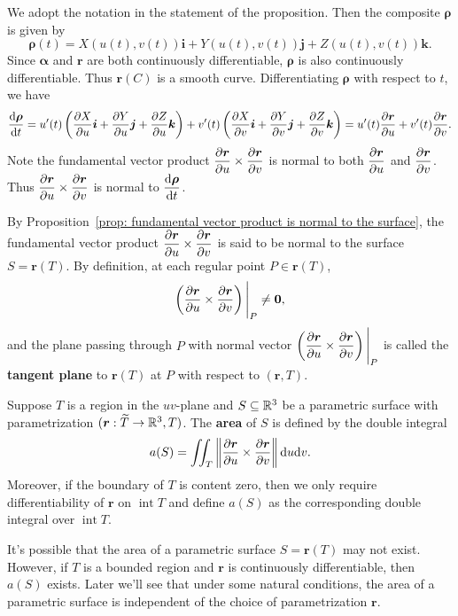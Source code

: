 \begin{proofenv}
    We adopt the notation in the statement of the proposition. Then the composite $\bm \rho$ is given by
    $$ \bm \rho(t) = X(u(t), v(t))\bm i + Y(u(t), v(t))\bm j + Z(u(t), v(t))\bm k. $$
    Since $\bm \alpha$ and $\bm r$ are both continuously differentiable, $\bm \rho$ is also continuously differentiable. Thus $\bm r(C)$ is a smooth curve. Differentiating $\bm \rho$ with respect to $t$, we have
    $$ \begin{aligned}
        \dv{\bm \rho}{t} = u'(t)\left( \pdv{X}{u} \bm i + \pdv{Y}{u} \bm j + \pdv{Z}{u} \bm k \right) + v'(t)\left( \pdv{X}{v} \bm i + \pdv{Y}{v} \bm j + \pdv{Z}{v} \bm k \right)
        = u'(t)\pdv{\bm r}{u} + v'(t)\pdv{\bm r}{v}.
    \end{aligned} $$
    Note the fundamental vector product $\displaystyle \pdv{\bm r}{u}\times \pdv{\bm r}{v}$ is normal to both $\displaystyle \pdv{\bm r}{u}$ and $\displaystyle \pdv{\bm r}{v}$. Thus $\displaystyle \pdv{\bm r}{u}\times \pdv{\bm r}{v}$ is normal to $\displaystyle \dv{\bm \rho}{t}$.
\end{proofenv}
\begin{remarkenv}
    By Proposition~\ref{prop: fundamental vector product is normal to the surface}, the fundamental vector product $\displaystyle \pdv{\bm r}{u}\times \pdv{\bm r}{v}$ is said to be normal to the surface $S = \bm r(T)$. By definition, at each regular point $P\in \bm r(T)$,
    $$ \left( \pdv{\bm r}{u}\times \pdv{\bm r}{v} \right) \Bigg|_P \ne \bm 0, $$
    and the plane passing through $P$ with normal vector $\displaystyle \left( \pdv{\bm r}{u}\times \pdv{\bm r}{v} \right)\Bigg|_P$ is called the \textbf{tangent plane} to $\bm r(T)$ at $P$ with respect to $(\bm r, T)$. 
\end{remarkenv}
\begin{definitionenv}
    Suppose $T$ is a region in the $uv$-plane and $S\subseteq \mathbb{R}^3$ be a parametric surface with parametrization $(\bm r: \widetilde T\to \mathbb{R}^3, T)$. The \textbf{area} of $S$ is defined by the double integral
    $$ a(S) = \iint_T \left\| \pdv{\bm r}{u}\times \pdv{\bm r}{v} \right\| \dd u \dd v. $$
    Moreover, if the boundary of $T$ is content zero, then we only require differentiability of $\bm r$ on $\operatorname{int} T$ and define $a(S)$ as the corresponding double integral over $\operatorname{int} T$.
\end{definitionenv}
\begin{remarkenv}
    It's possible that the area of a parametric surface $S=\bm r(T)$ may not exist. However, if $T$ is a bounded region and $\bm r$ is continuously differentiable, then $a(S)$ exists. Later we'll see that under some natural conditions, the area of a parametric surface is independent of the choice of parametrization $\bm r$.
\end{remarkenv}
